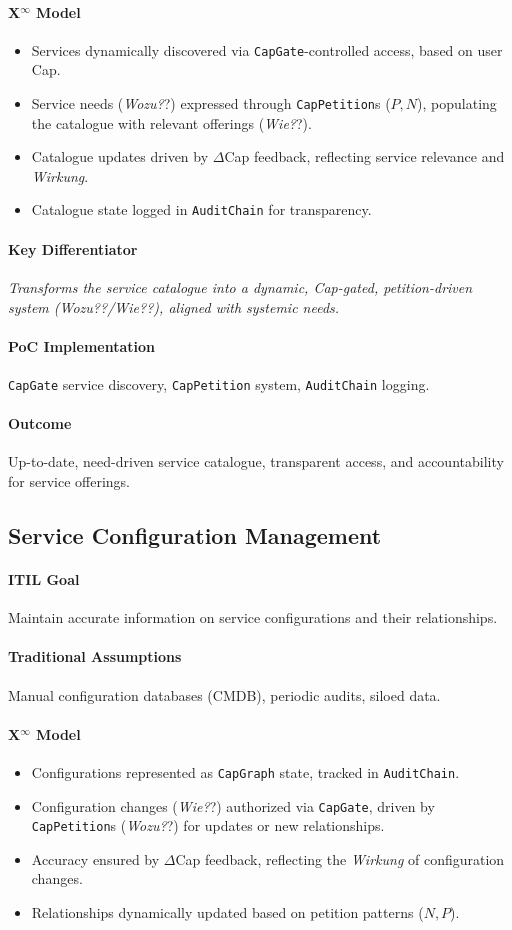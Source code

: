 \documentclass[12pt, a4paper]{scrartcl}
\newcommand{\Xinf}{X$^\infty$}                        %
\newcommand{\DeltaCap}{$\Delta$Cap}                    %
\newcommand{\Wirkung}{\textit{Wirkung}}                 %
\newcommand{\CapGate}{\texttt{CapGate}}
\newcommand{\AuditChain}{\texttt{AuditChain}}
\newcommand{\CapPetition}{\texttt{CapPetition}}        %
\newcommand{\Wozu}{\textit{Wozu?}}                      %
\newcommand{\Wie}{\textit{Wie?}}                        %
\begin{document}
\paragraph*{\Xinf{} Model}
\begin{itemize}
    \item Services dynamically discovered via \CapGate{}-controlled access, based on user Cap.
    \item Service needs (\Wozu?) expressed through \CapPetition{}s ($P, N$), populating the catalogue with relevant offerings (\Wie?).
    \item Catalogue updates driven by \DeltaCap{} feedback, reflecting service relevance and \Wirkung{}.
    \item Catalogue state logged in \AuditChain{} for transparency.
\end{itemize}
\paragraph{Key Differentiator} \textit{Transforms the service catalogue into a dynamic, Cap-gated, petition-driven system (\Wozu?/\Wie?), aligned with systemic needs.}
\paragraph{PoC Implementation} \CapGate{} service discovery, \CapPetition{} system, \AuditChain{} logging.
\paragraph{Outcome} Up-to-date, need-driven service catalogue, transparent access, and accountability for service offerings.

\subsection{Service Configuration Management} %
\paragraph{ITIL Goal} Maintain accurate information on service configurations and their relationships.
\paragraph{Traditional Assumptions} Manual configuration databases (CMDB), periodic audits, siloed data.
\paragraph*{\Xinf{} Model}
\begin{itemize}
    \item Configurations represented as \texttt{CapGraph} state, tracked in \AuditChain{}.
    \item Configuration changes (\Wie?) authorized via \CapGate{}, driven by \CapPetition{}s (\Wozu?) for updates or new relationships.
    \item Accuracy ensured by \DeltaCap{} feedback, reflecting the \Wirkung{} of configuration changes.
    \item Relationships dynamically updated based on petition patterns ($N, P$).
\end{itemize}
\end{document}
